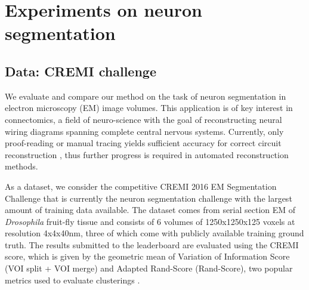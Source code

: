 
\section{Experiments on neuron segmentation}
\subsection{Data: CREMI challenge} \label{sec:cremi_challenge}
We evaluate and compare our method on the task of neuron segmentation in electron microscopy (EM) image volumes. This application is of key interest in connectomics, a field of neuro-science with the goal of reconstructing neural wiring diagrams spanning complete central nervous systems. Currently, only proof-reading or manual tracing yields sufficient accuracy for correct circuit reconstruction \cite{schlegel2017learning}, thus further progress is required in automated reconstruction methods.

As a dataset, we consider the competitive CREMI 2016 EM Segmentation Challenge \cite{cremiChallenge} that is currently the neuron segmentation challenge with the largest amount of training data available. The dataset comes from serial section EM of \emph{Drosophila} fruit-fly tissue and consists of 6 volumes of 1250x1250x125 voxels at resolution 4x4x40nm, three of which come with publicly available training ground truth. The results submitted to the leaderboard are evaluated using the CREMI score, which is given by the geometric mean of Variation of Information Score (VOI split + VOI merge) and Adapted Rand-Score (Rand-Score), two popular metrics used to evaluate clusterings \cite{arganda2015crowdsourcing}.\\

